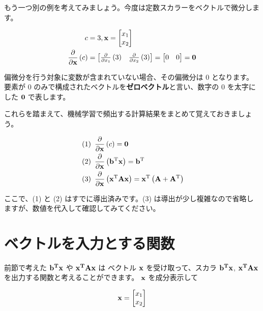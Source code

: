 もう一つ別の例を考えてみましょう。今度は定数スカラーをベクトルで微分します。


\[
\begin{aligned}
c
&=
3 ,
{\bf x}
=
\begin{bmatrix}
x_{1} \\
x_{2}
\end{bmatrix} \\
\frac{\partial}{\partial {\bf x}} \left( c \right)
&=
\begin{bmatrix}
\frac{\partial}{\partial x_1} \left( 3 \right) & \frac{\partial}{\partial x_2} \left( 3 \right)
\end{bmatrix}
=
\begin{bmatrix}
0 & 0
\end{bmatrix}
=
{\bf 0}
\end{aligned}
\]


偏微分を行う対象に変数が含まれていない場合、その偏微分は $0$ となります。要素が $0$ のみで構成されたベクトルを\textbf{ゼロベクトル}と言い、数字の $0$ を太字にした ${\bf 0}$ で表します。


これらを踏まえて、機械学習で頻出する計算結果をまとめて覚えておきましょう。


\[
\begin{aligned}
&\left( 1 \right) \ \frac{\partial}{\partial {\bf x}} \left( c \right) = {\bf 0} \\
&\left( 2 \right) \ \frac{\partial}{\partial {\bf x}} \left( {\bf b}^{\rm T}{\bf x} \right) = {\bf b}^{\rm T} \\
&\left( 3 \right) \ \frac{\partial}{\partial {\bf x}} \left( {\bf x}^{\rm T}{\bf A}{\bf x} \right) = {\bf x}^{\rm T} \left( {\bf A} + {\bf A}^{\rm T} \right)
\end{aligned}
\]


ここで、(1) と (2) はすでに導出済みです。(3) は導出が少し複雑なので省略しますが、数値を代入して確認してみてください。


\section{ベクトルを入力とする関数}


前節で考えた ${\bf b^T x}$ や ${\bf x^T A x}$ は  ベクトル ${\bf x}$ を受け取って、スカラ ${\bf b^T x}$, ${\bf x^T A x}$ を出力する関数と考えることができます。 ${\bf x}$ を成分表示して


\[
{\bf x} = \begin{bmatrix} x_1 \\ x_2 \end{bmatrix}
\]


